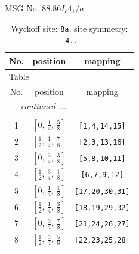\documentclass[fleqn,8pt]{jsarticle}
\begin{document}
\setcounter{MaxMatrixCols}{32}

\renewcommand{\tablename}{Table~}
\renewcommand{\figurename}{Figure~}
\begin{center}
\LARGE
MSG No. 88.86\quad$I_{c}4_{1}/a$
\end{center}
\renewcommand{\arraystretch}{1.2}
\begin{longtable}{ccc}
\caption{Wyckoff site: {\tt 8a}, site symmetry: {\tt -4..}}
 \\
 \hline \hline
No. & position & mapping \\ \hline \endfirsthead

\multicolumn{2}{l}{\tablename\ \thetable{}} \\
 \hline \hline
No. & position & mapping \\ \hline \endhead

 \hline \hline
\multicolumn{2}{r}{\footnotesize\it continued ...} \\ \endfoot

 \hline \hline
\multicolumn{2}{r}{} \\ \endlastfoot

1 & $\left[ 0,\, \frac{1}{4},\, \frac{5}{8} \right]$ & {\tt [1,4,14,15]} \\ \hline
2 & $\left[ \frac{1}{2},\, \frac{1}{4},\, \frac{7}{8} \right]$ & {\tt [2,3,13,16]} \\ \hline
3 & $\left[ 0,\, \frac{3}{4},\, \frac{3}{8} \right]$ & {\tt [5,8,10,11]} \\ \hline
4 & $\left[ \frac{1}{2},\, \frac{3}{4},\, \frac{1}{8} \right]$ & {\tt [6,7,9,12]} \\ \hline
5 & $\left[ 0,\, \frac{1}{4},\, \frac{1}{8} \right]$ & {\tt [17,20,30,31]} \\ \hline
6 & $\left[ \frac{1}{2},\, \frac{1}{4},\, \frac{3}{8} \right]$ & {\tt [18,19,29,32]} \\ \hline
7 & $\left[ 0,\, \frac{3}{4},\, \frac{7}{8} \right]$ & {\tt [21,24,26,27]} \\ \hline
8 & $\left[ \frac{1}{2},\, \frac{3}{4},\, \frac{5}{8} \right]$ & {\tt [22,23,25,28]} \\
\end{longtable}
\renewcommand{\arraystretch}{1.2}
\end{document}
